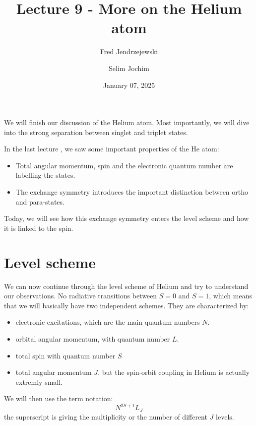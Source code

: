 \documentclass[10pt]{article}
\let\cite\citep
\renewenvironment{abstract}
  {{\bfseries\noindent{\abstractname}\par\nobreak}\footnotesize}
  {\bigskip}
\providecommand\citep{\cite}
\begin{document}
\title{Lecture 9 - More on the Helium atom}



\author[1]{Fred Jendrzejewski}%
\author[2]{Selim Jochim}%
%
%


\vspace{-1em}



  
  \date{January 07, 2025}


\begingroup
\let\center\flushleft
\let\endcenter\endflushleft
\maketitle
\endgroup





\begin{abstract}
We will finish our discussion of the Helium atom. Most importantly, we will dive into the strong separation between singlet and triplet states.%
\end{abstract}%



\sloppy


In the last lecture \cite{Jendrzejewski}, we saw some important properties of the He atom:
\begin{itemize}
\item Total angular momentum, spin and the electronic quantum number are labelling the states.
\item The exchange symmetry introduces the important distinction between ortho and para-states.
\end{itemize}
Today, we will see how this exchange symmetry enters the level scheme and how it is linked to the spin. 

\section{Level scheme}

We can now continue through the level scheme of Helium and try to understand our observations. No radiative transitions between $S=0$ and $S=1$, which means that we will basically have two independent schemes. They are characterized by:
\begin{itemize}
\item electronic excitations, which are the main quantum numbers $N$.
\item orbital angular momentum, with quantum number $L$.
\item total spin with quantum number $S$
\item total angular momentum $J$, but the spin-orbit coupling in Helium is actually extremly small.
\end{itemize}
We will then use the term notation:
\begin{equation}
N ^{2S+1}L_J
\end{equation}
the superscript is giving the multiplicity or the number of different $J$ levels. 
\end{document}
